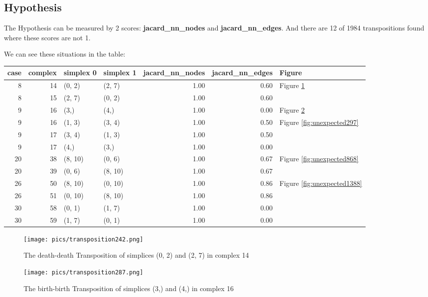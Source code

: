 \documentclass{article}
\begin{document}
\subsection{Hypothesis}

\par The Hypothesis can be measured by 2 scores: \textbf{jacard\_nn\_nodes} and \textbf{jacard\_nn\_edges}.
And there are 12 of 1984 transpositions found where these scores are not 1.
\par We can see these situations in the table:
\begin{center}\begin{tabular}{rrllrrl}
\toprule
case & complex & simplex 0 & simplex 1 & jacard\_nn\_nodes & jacard\_nn\_edges & Figure \\
\midrule
8 & 14 & (0, 2) & (2, 7) & 1.00 & 0.60 & Figure \ref{fig:unexpected242} \\
8 & 15 & (2, 7) & (0, 2) & 1.00 & 0.60 &  \\
9 & 16 & (3,) & (4,) & 1.00 & 0.00 & Figure \ref{fig:unexpected287} \\
9 & 16 & (1, 3) & (3, 4) & 1.00 & 0.50 & Figure \ref{fig:unexpected297} \\
9 & 17 & (3, 4) & (1, 3) & 1.00 & 0.50 &  \\
9 & 17 & (4,) & (3,) & 1.00 & 0.00 &  \\
20 & 38 & (8, 10) & (0, 6) & 1.00 & 0.67 & Figure \ref{fig:unexpected868} \\
20 & 39 & (0, 6) & (8, 10) & 1.00 & 0.67 &  \\
26 & 50 & (8, 10) & (0, 10) & 1.00 & 0.86 & Figure \ref{fig:unexpected1388} \\
26 & 51 & (0, 10) & (8, 10) & 1.00 & 0.86 &  \\
30 & 58 & (0, 1) & (1, 7) & 1.00 & 0.00 &  \\
30 & 59 & (1, 7) & (0, 1) & 1.00 & 0.00 &  \\
\bottomrule
\end{tabular}
\end{center}


\begin{figure}[ht]
\centering
\texttt{[image: pics/transposition242.png]}
\caption{The death-death Transposition of simplices (0, 2) and (2, 7) in complex 14}
\label{fig:unexpected242}
\end{figure}

\begin{figure}[ht]
\centering
\texttt{[image: pics/transposition287.png]}
\caption{The birth-birth Transposition of simplices (3,) and (4,) in complex 16}
\label{fig:unexpected287}
\end{figure}
\end{document}
